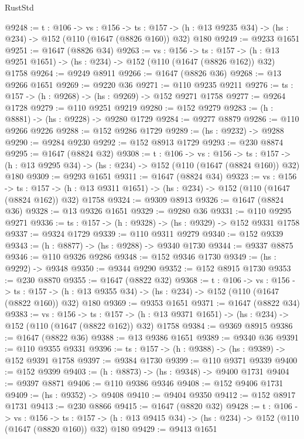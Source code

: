 \begin{lexlean}{RustStd}
\begin{coremodule}
@9248 := {t : @106} ->
  {vs : @156} ->
  {ts : @157} -> (h : @13 @9235 @34) -> (hs : @234) -> @152 (@110 (@1647 (@8826 @160)) @32) @180
@9249 := @9233 @1651
@9251 := @1647 (@8826 @34)
@9263 := {vs : @156} ->
  {ts : @157} -> (h : @13 @9251 @1651) -> (hs : @234) -> @152 (@110 (@1647 (@8826 @162)) @32) @1758
@9264 := @9249 @8911
@9266 := @1647 (@8826 @36)
@9268 := @13 @9266 @1651
@9269 := @9220 @36
@9271 := @110 @9235 @9211
@9276 := {ts : @157} -> (h : @9268) -> (hs : @9269) -> @152 @9271 @1758
@9277 := @9264 @1728
@9279 := @110 @9251 @9219
@9280 := @152 @9279
@9283 := (h : @8881) -> (hs : @9228) -> @9280 @1729
@9284 := @9277 @8879
@9286 := @110 @9266 @9226
@9288 := @152 @9286 @1729
@9289 := (hs : @9232) -> @9288
@9290 := @9284 @9230
@9292 := @152 @8913 @1729
@9293 := @230 @8874
@9295 := @1647 (@8824 @32)
@9308 := {t : @106} ->
  {vs : @156} ->
  {ts : @157} -> (h : @13 @9295 @34) -> (hs : @234) -> @152 (@110 (@1647 (@8824 @160)) @32) @180
@9309 := @9293 @1651
@9311 := @1647 (@8824 @34)
@9323 := {vs : @156} ->
  {ts : @157} -> (h : @13 @9311 @1651) -> (hs : @234) -> @152 (@110 (@1647 (@8824 @162)) @32) @1758
@9324 := @9309 @8913
@9326 := @1647 (@8824 @36)
@9328 := @13 @9326 @1651
@9329 := @9280 @36
@9331 := @110 @9295 @9271
@9336 := {ts : @157} -> (h : @9328) -> (hs : @9329) -> @152 @9331 @1758
@9337 := @9324 @1729
@9339 := @110 @9311 @9279
@9340 := @152 @9339
@9343 := (h : @8877) -> (hs : @9288) -> @9340 @1730
@9344 := @9337 @8875
@9346 := @110 @9326 @9286
@9348 := @152 @9346 @1730
@9349 := (hs : @9292) -> @9348
@9350 := @9344 @9290
@9352 := @152 @8915 @1730
@9353 := @230 @8870
@9355 := @1647 (@8822 @32)
@9368 := {t : @106} ->
  {vs : @156} ->
  {ts : @157} -> (h : @13 @9355 @34) -> (hs : @234) -> @152 (@110 (@1647 (@8822 @160)) @32) @180
@9369 := @9353 @1651
@9371 := @1647 (@8822 @34)
@9383 := {vs : @156} ->
  {ts : @157} -> (h : @13 @9371 @1651) -> (hs : @234) -> @152 (@110 (@1647 (@8822 @162)) @32) @1758
@9384 := @9369 @8915
@9386 := @1647 (@8822 @36)
@9388 := @13 @9386 @1651
@9389 := @9340 @36
@9391 := @110 @9355 @9331
@9396 := {ts : @157} -> (h : @9388) -> (hs : @9389) -> @152 @9391 @1758
@9397 := @9384 @1730
@9399 := @110 @9371 @9339
@9400 := @152 @9399
@9403 := (h : @8873) -> (hs : @9348) -> @9400 @1731
@9404 := @9397 @8871
@9406 := @110 @9386 @9346
@9408 := @152 @9406 @1731
@9409 := (hs : @9352) -> @9408
@9410 := @9404 @9350
@9412 := @152 @8917 @1731
@9413 := @230 @8866
@9415 := @1647 (@8820 @32)
@9428 := {t : @106} ->
  {vs : @156} ->
  {ts : @157} -> (h : @13 @9415 @34) -> (hs : @234) -> @152 (@110 (@1647 (@8820 @160)) @32) @180
@9429 := @9413 @1651

\end{coremodule}
\end{lexlean}
